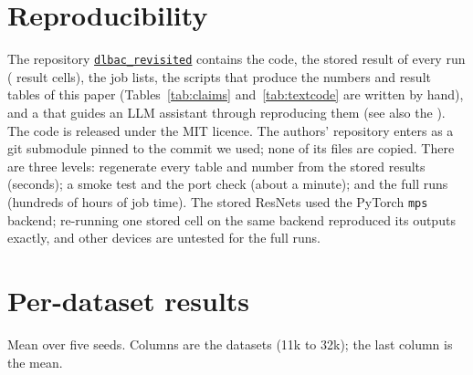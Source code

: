 \documentclass[11pt,a4paper]{article}
\newcommand{\repo}{\href{https://github.com/arnav13081994/dlbac_revisited}{\texttt{dlbac\_revisited}}}
\newcommand{\repofile}[1]{\href{https://github.com/arnav13081994/dlbac_revisited/blob/main/#1}{\texttt{\detokenize{#1}}}}
\begin{document}
\section{Reproducibility}
The repository \repo{} contains the code, the stored result of every run (\nCells{} result cells), the job lists, the scripts that produce the numbers and result tables of this paper (Tables~\ref{tab:claims} and~\ref{tab:textcode} are written by hand), and a \repofile{CLAUDE.md} that guides an LLM assistant through reproducing them (see also the \repofile{README.md}). The code is released under the MIT licence. The authors' repository enters as a git submodule pinned to the commit we used; none of its files are copied. There are three levels: regenerate every table and number from the stored results (seconds); a smoke test and the port check (about a minute); and the full runs (hundreds of hours of job time). The stored ResNets used the PyTorch \texttt{mps} backend; re-running one stored cell on the same backend reproduced its outputs exactly, and other devices are untested for the full runs.

\appendix
\section{Per-dataset results}
Mean over five seeds. Columns are the datasets (11k to 32k); the last column is the mean.
\begin{table}[h]
\centering\scriptsize\setlength{\tabcolsep}{3pt}

\caption{F1.}
\end{table}
\begin{table}[h]
\centering\scriptsize\setlength{\tabcolsep}{3pt}

\caption{False-positive rate.}
\end{table}
\begin{table}[h]
\centering\scriptsize\setlength{\tabcolsep}{3pt}

\caption{True-positive rate.}
\end{table}
\begin{table}[h]
\centering\scriptsize\setlength{\tabcolsep}{3pt}

\caption{Precision.}
\end{table}



\end{document}
